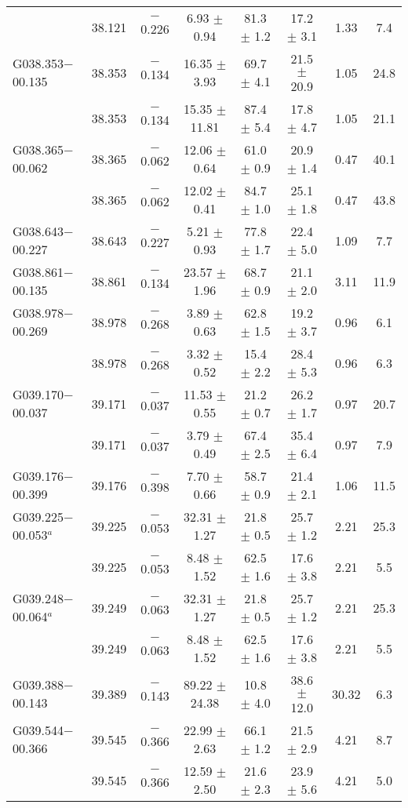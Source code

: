 \begin{ThreePartTable}
\begin{longtable}{lccccccc}
                      &38.121&	$-$0.226	&6.93	$\pm$ 0.94	&81.3	$\pm$ 1.2	&17.2	$\pm$ 3.1	&1.33	&7.4\\
G038.353$-$00.135     &38.353&	$-$0.134	&16.35	$\pm$ 3.93	&69.7	$\pm$ 4.1	&21.5	$\pm$ 20.9	&1.05	&24.8\\
                      &38.353&	$-$0.134	&15.35	$\pm$ 11.81	&87.4	$\pm$ 5.4	&17.8	$\pm$ 4.7	&1.05	&21.1\\
G038.365$-$00.062     &38.365&	$-$0.062	&12.06	$\pm$ 0.64	&61.0	$\pm$ 0.9	&20.9	$\pm$ 1.4	&0.47	&40.1\\
                      &38.365&	$-$0.062	&12.02	$\pm$ 0.41	&84.7	$\pm$ 1.0	&25.1	$\pm$ 1.8	&0.47	&43.8\\
G038.643$-$00.227     &38.643&	$-$0.227	&5.21	$\pm$ 0.93	&77.8	$\pm$ 1.7	&22.4	$\pm$ 5.0	&1.09	&7.7\\
G038.861$-$00.135     &38.861&	$-$0.134	&23.57	$\pm$ 1.96	&68.7	$\pm$ 0.9	&21.1	$\pm$ 2.0	&3.11	&11.9\\
G038.978$-$00.269     &38.978&	$-$0.268	&3.89	$\pm$ 0.63	&62.8	$\pm$ 1.5	&19.2	$\pm$ 3.7	&0.96	&6.1\\
                      &38.978&	$-$0.268	&3.32	$\pm$ 0.52	&15.4	$\pm$ 2.2	&28.4	$\pm$ 5.3	&0.96	&6.3\\
G039.170$-$00.037     &39.171&	$-$0.037	&11.53	$\pm$ 0.55	&21.2	$\pm$ 0.7	&26.2	$\pm$ 1.7	&0.97	&20.7\\
                      &39.171&	$-$0.037	&3.79	$\pm$ 0.49	&67.4	$\pm$ 2.5	&35.4	$\pm$ 6.4	&0.97	&7.9\\
G039.176$-$00.399     &39.176&	$-$0.398	&7.70	$\pm$ 0.66	&58.7	$\pm$ 0.9	&21.4	$\pm$ 2.1	&1.06	&11.5\\
G039.225$-$00.053$^a$ &39.225&	$-$0.053	&32.31	$\pm$ 1.27	&21.8	$\pm$ 0.5	&25.7	$\pm$ 1.2	&2.21	&25.3\\
                      &39.225&	$-$0.053	&8.48	$\pm$ 1.52	&62.5	$\pm$ 1.6	&17.6	$\pm$ 3.8	&2.21	&5.5\\
G039.248$-$00.064$^a$ &39.249&	$-$0.063	&32.31	$\pm$ 1.27	&21.8	$\pm$ 0.5	&25.7	$\pm$ 1.2	&2.21	&25.3\\
                      &39.249&	$-$0.063	&8.48	$\pm$ 1.52	&62.5	$\pm$ 1.6	&17.6	$\pm$ 3.8	&2.21	&5.5\\
G039.388$-$00.143     &39.389&	$-$0.143	&89.22	$\pm$ 24.38	&10.8	$\pm$ 4.0	&38.6	$\pm$ 12.0	&30.32	&6.3\\
G039.544$-$00.366     &39.545&	$-$0.366	&22.99	$\pm$ 2.63	&66.1	$\pm$ 1.2	&21.5	$\pm$ 2.9	&4.21	&8.7\\
                      &39.545&	$-$0.366	&12.59	$\pm$ 2.50	&21.6	$\pm$ 2.3	&23.9	$\pm$ 5.6	&4.21	&5.0\\

\end{longtable}
\end{ThreePartTable}
